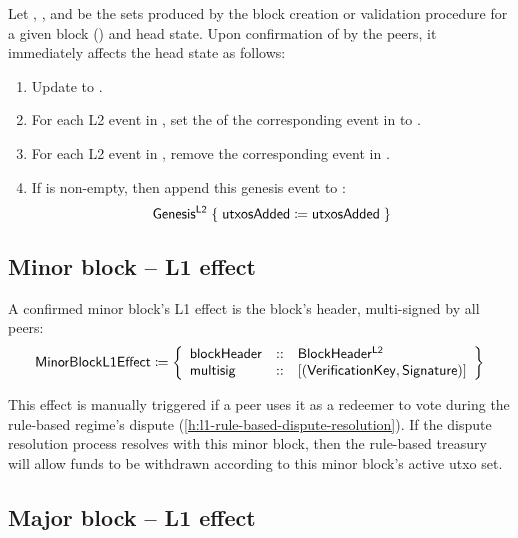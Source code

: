 \documentclass[../hydrozoa.tex]{subfiles}
\begin{document}
Let , , and  be the sets produced by the block creation or validation procedure for a given block () and head state.
Upon confirmation of  by the peers, it immediately affects the head state as follows:
\begin{enumerate}
  \item Update  to .
  \item For each L2 event in , set the  of the corresponding event in  to .
  \item For each L2 event in , remove the corresponding event in .
  \item If  is non-empty, then append this genesis event to :
    \begin{equation*}
      \mathsf{Genesis^{L2}} \;\{\; \mathsf{utxosAdded} \coloneq \mathsf{utxosAdded} \;\}
    \end{equation*}
\end{enumerate}

\subsection{Minor block -- L1 effect}%
\label{h:l2-block-effect-minor-block}%

A confirmed minor block's L1 effect is the block's header, multi-signed by all peers:
\begin{equation*}
  \mathsf{MinorBlockL1Effect} \coloneq \left\{
    \begin{array}{lll}
      \mathsf{blockHeader} &::& \mathsf{BlockHeader^{L2}} \\
      \mathsf{multisig} &::& [(\mathsf{VerificationKey}, \mathsf{Signature})]
    \end{array}\right\}
\end{equation*}

This effect is manually triggered if a peer uses it as a redeemer to vote during the rule-based regime's dispute (\cref{h:l1-rule-based-dispute-resolution}).
If the dispute resolution process resolves with this minor block, then the rule-based treasury will allow funds to be withdrawn according to this minor block's active utxo set.

\subsection{Major block -- L1 effect}%
\label{h:l2-block-effect-major-block}%
\end{document}
